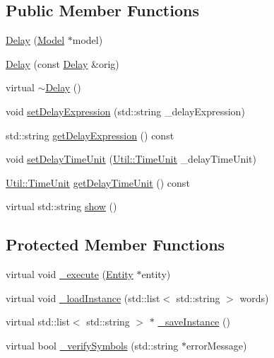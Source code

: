 \subsection*{Public Member Functions}
\begin{DoxyCompactItemize}
\item 
\hyperlink{class_delay_a155ad32911b3289d968cca746f940520}{Delay} (\hyperlink{class_model}{Model} $\ast$model)
\item 
\hyperlink{class_delay_a5892fd8feb283f11980c0a9adb9befa7}{Delay} (const \hyperlink{class_delay}{Delay} \&orig)
\item 
virtual \hyperlink{class_delay_afee934130955d45563a6c5baaaf052d2}{$\sim$\+Delay} ()
\item 
void \hyperlink{class_delay_a683b53af607a424477acb946eb3afdfc}{set\+Delay\+Expression} (std\+::string \+\_\+delay\+Expression)
\item 
std\+::string \hyperlink{class_delay_a58559eda9ed25330d29b967c1bb0add5}{get\+Delay\+Expression} () const 
\item 
void \hyperlink{class_delay_abe7e89dba0974a81d00e6d2c0548fc1e}{set\+Delay\+Time\+Unit} (\hyperlink{class_util_a28504cc2fecc9aa47154cba4e625ec6f}{Util\+::\+Time\+Unit} \+\_\+delay\+Time\+Unit)
\item 
\hyperlink{class_util_a28504cc2fecc9aa47154cba4e625ec6f}{Util\+::\+Time\+Unit} \hyperlink{class_delay_a0561a6fdb4dd317952b5bb8d87b0c15f}{get\+Delay\+Time\+Unit} () const 
\item 
virtual std\+::string \hyperlink{class_delay_af8187e4515417b547dc22b5ee0a1f95d}{show} ()
\end{DoxyCompactItemize}
\subsection*{Protected Member Functions}
\begin{DoxyCompactItemize}
\item 
virtual void \hyperlink{class_delay_a029d91a2cd736ff9c361c69336e6ab41}{\+\_\+execute} (\hyperlink{class_entity}{Entity} $\ast$entity)
\item 
virtual void \hyperlink{class_delay_acd33d05fc1c8d6d66a6f674e49ee7c61}{\+\_\+load\+Instance} (std\+::list$<$ std\+::string $>$ words)
\item 
virtual std\+::list$<$ std\+::string $>$ $\ast$ \hyperlink{class_delay_a73676f11cddd31439a407b5dabcea43a}{\+\_\+save\+Instance} ()
\item 
virtual bool \hyperlink{class_delay_af1690df9ba58e9972f5721f5bdc2b520}{\+\_\+verify\+Symbols} (std\+::string $\ast$error\+Message)
\end{DoxyCompactItemize}
